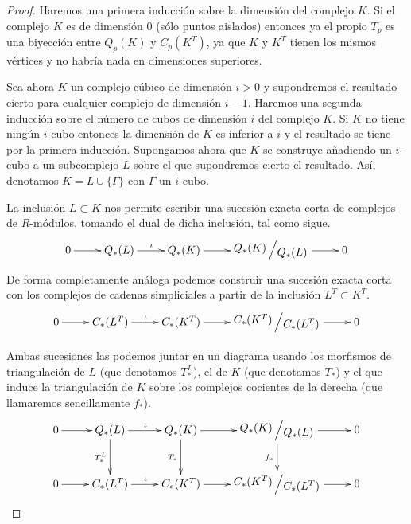 \documentclass[12pt,a4paper,twoside]{article} %
\theoremstyle{plain}
\theoremstyle{definition}
\newcommand{\quotient}[2]{{\raisebox{.2em}{$#1$}\left/\raisebox{-.2em}{$#2$}\right.}}
\begin{document}
\begin{proof}
Haremos una primera inducción sobre la dimensión del complejo $K$. Si el complejo $K$ es de dimensión 0 (sólo puntos aislados) entonces ya el propio $T_p$ es una biyección entre $Q_p(K)$ y $C_p(K^T)$, ya que $K$ y $K^T$ tienen los mismos vértices y no habría nada en dimensiones superiores.

Sea ahora $K$ un complejo cúbico de dimensión $i>0$ y supondremos el resultado cierto para cualquier complejo de dimensión $i-1$. Haremos una segunda inducción sobre el número de cubos de dimensión $i$ del complejo $K$. Si $K$ no tiene ningún $i$-cubo entonces la dimensión de $K$ es inferior a $i$ y el resultado se tiene por la primera inducción. Supongamos ahora que $K$ se construye añadiendo un $i$-cubo a un subcomplejo $L$ sobre el que supondremos cierto el resultado. Así, denotamos $K=L\cup\{\Gamma\}$ con $\Gamma$ un $i$-cubo.

La inclusión $L\subset K$ nos permite escribir una sucesión exacta corta de complejos de $R$-módulos, tomando el dual de dicha inclusión, tal como sigue.
\begin{equation*}
\xymatrix{
0 \ar[r]    & Q_*(L) \ar[r]^{\iota}   & Q_*(K) \ar[r]    & \quotient{Q_*(K)}{Q_*(L)} \ar[r] & 0
}
\end{equation*}
De forma completamente análoga podemos construir una sucesión exacta corta con los complejos de cadenas simpliciales a partir de la inclusión $L^T \subset K^T$. 
\begin{equation*}
\xymatrix{
0 \ar[r]    & C_*(L^T) \ar[r]^{\iota}   & C_*(K^T) \ar[r]    & \quotient{C_*(K^T)}{C_*(L^T)} \ar[r] & 0
}
\end{equation*}

Ambas sucesiones las podemos juntar en un diagrama usando los morfismos de triangulación de $L$ (que denotamos $T_*^L$), el de $K$ (que denotamos $T_*$) y el que induce la triangulación de $K$ sobre los complejos cocientes de la derecha (que llamaremos sencillamente $f_*$).
\begin{equation*}
\xymatrix{
0 \ar[r] & Q_*(L) \ar[r]^{\iota}\ar[d]_{T_*^L} & Q_*(K) \ar[r]\ar[d]_{T_*} & \quotient{Q_*(K)}{Q_*(L)} \ar[r] \ar[d]_{f_*} & 0 \\
0 \ar[r]    & C_*(L^T) \ar[r]^{\iota}   & C_*(K^T) \ar[r]    & \quotient{C_*(K^T)}{C_*(L^T)} \ar[r] & 0
}
\end{equation*}


\end{proof}
\end{document}
